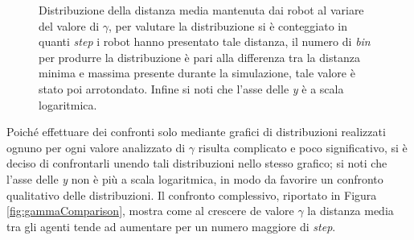 \begin{figure}
	\hfill
	\caption{Distribuzione della distanza media mantenuta dai robot al variare del valore di $\gamma$, per valutare la distribuzione si è conteggiato in quanti \textit{step} i robot hanno presentato tale distanza, il numero di \textit{bin} per produrre la distribuzione è pari alla differenza tra la distanza minima e massima presente durante la simulazione, tale valore è stato poi arrotondato. Infine si noti che l'asse delle \textit{y} è a scala logaritmica.}
	\label{fig:gammaDistr}
\end{figure}
Poiché effettuare dei confronti solo mediante grafici di distribuzioni realizzati ognuno per ogni valore analizzato di $\gamma$ risulta complicato e poco significativo, si è deciso di confrontarli unendo tali distribuzioni nello stesso grafico; si noti che l'asse delle \textit{y} non è più a scala logaritmica, in modo da favorire un confronto qualitativo delle distribuzioni.
Il confronto complessivo, riportato in Figura \ref{fig:gammaComparison}, mostra come al crescere de valore $\gamma$ la distanza media tra gli agenti tende ad aumentare per un numero maggiore di \textit{step}.

